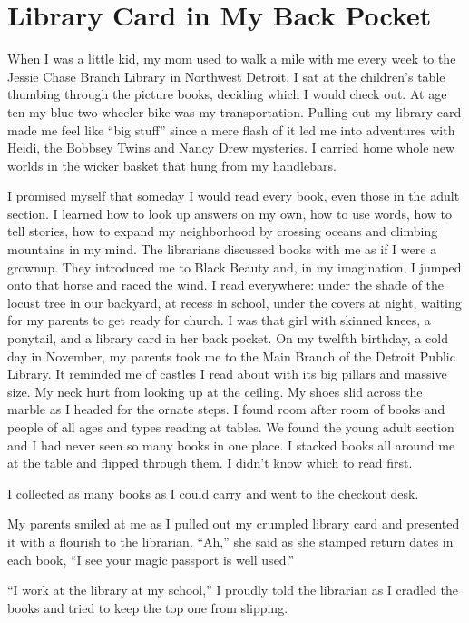 \documentclass[twoside,10pt]{book}
\begin{document}
\cleardoublepage
\chapter{Library Card in My Back Pocket}

When I was a little kid, my mom used to walk a mile with me every week
to the Jessie Chase Branch Library in Northwest Detroit. I sat at the
children's table thumbing through the picture books, deciding which I
would check out. At age ten my blue two-wheeler bike was my
transportation. Pulling out my library card made me feel like ``big
stuff'' since a mere flash of it led me into adventures with Heidi, the
Bobbsey Twins and Nancy Drew mysteries. I carried home whole new worlds
in the wicker basket that hung from my handlebars.

I promised myself that someday I would read every book, even those in
the adult section. I learned how to look up answers on my own, how to
use words, how to tell stories, how to expand my neighborhood by
crossing oceans and climbing mountains in my mind. The librarians
discussed books with me as if I were a grownup. They introduced me to
Black Beauty and, in my imagination, I jumped onto that horse and raced
the wind. I read everywhere: under the shade of the locust tree in our
backyard, at recess in school, under the covers at night, waiting for my
parents to get ready for church. I was that girl with skinned knees, a
ponytail, and a library card in her back pocket. On my twelfth birthday,
a cold day in November, my parents took me to the Main Branch of the
Detroit Public Library. It reminded me of castles I read about with its
big pillars and massive size. My neck hurt from looking up at the
ceiling. My shoes slid across the marble as I headed for the ornate
steps. I found room after room of books and people of all ages and types
reading at tables. We found the young adult section and I had never seen
so many books in one place. I stacked books all around me at the table
and flipped through them. I didn't know which to read first.

I collected as many books as I could carry and went to the checkout
desk.

My parents smiled at me as I pulled out my crumpled library card and
presented it with a flourish to the librarian. ``Ah,'' she said as she
stamped return dates in each book, ``I see your magic passport is well
used.''

``I work at the library at my school,'' I proudly told the librarian as
I cradled the books and tried to keep the top one from slipping.
\end{document}
